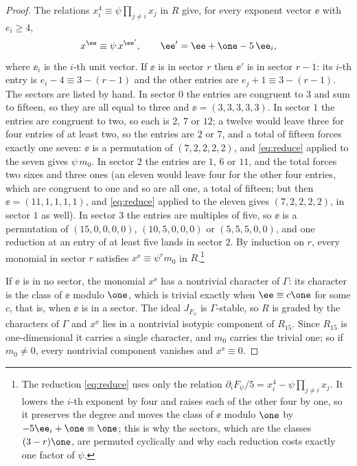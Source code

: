 \begin{proof}
The relations $x_i^4\equiv\psi\prod_{j\ne i}x_j$ in $R$ give, for every
exponent vector $\ee$ with $e_i\ge4$,
\begin{equation}\label{eq:reduce}
x^{\ee}\equiv\psi\,x^{\ee'},\qquad \ee'=\ee+\one-5\,\ee_i,
\end{equation}
where $\ee_i$ is the $i$-th unit vector. If $\ee$ is in sector $r$ then
$\ee'$ is in sector $r-1$: its $i$-th entry is $e_i-4\equiv 3-(r-1)$ and the
other entries are $e_j+1\equiv3-(r-1)$. The sectors are listed by hand. In
sector $0$ the entries are congruent to $3$ and sum to fifteen, so they are
all equal to three and $\ee=(3,3,3,3,3)$. In sector $1$ the entries are congruent to
two, so each is $2$, $7$ or $12$; a twelve would leave three for four
entries of at least two, so the entries are $2$ or $7$, and a total of
fifteen forces exactly one seven: $\ee$ is a
permutation of $(7,2,2,2,2)$, and \eqref{eq:reduce} applied to the seven
gives $\psi\,m_0$. In sector $2$ the entries are $1$, $6$ or $11$, and the
total forces two sixes and three ones (an eleven would leave four for the
other four entries, which are congruent to one and so are all one, a total
of fifteen; but then $\ee=(11,1,1,1,1)$, and \eqref{eq:reduce} applied to
the eleven gives $(7,2,2,2,2)$, in sector $1$ as well). In sector $3$ the
entries are multiples of five, so $\ee$ is a permutation of $(15,0,0,0,0)$,
$(10,5,0,0,0)$ or $(5,5,5,0,0)$, and one reduction at an entry of at least
five lands in sector $2$. By induction on $r$, every monomial in sector $r$
satisfies $x^{\ee}\equiv\psi^rm_0$ in $R$.\footnote{The reduction
\eqref{eq:reduce} uses only the relation $\partial_iF_\psi/5=x_i^4-\psi
\prod_{j\ne i}x_j$. It lowers the $i$-th exponent by four and raises each of
the other four by one, so it preserves the degree and moves the class of
$\ee$ modulo $\one$ by $-5\ee_i+\one\equiv\one$; this is why the sectors,
which are the classes $(3-r)\one$, are permuted cyclically and why each
reduction costs exactly one factor of $\psi$.}

If $\ee$ is in no sector, the monomial $x^{\ee}$ has a nontrivial character
of $\Gamma$: its character is the class of $\ee$ modulo $\one$, which is
trivial exactly when $\ee\equiv c\one$ for some $c$, that is, when $\ee$ is
in a sector. The ideal $J_{F_\psi}$ is $\Gamma$-stable, so $R$ is graded by
the characters of $\Gamma$ and $x^{\ee}$ lies in a nontrivial isotypic
component of $R_{15}$. Since $R_{15}$ is one-dimensional it carries a single
character, and $m_0$ carries the trivial one; so if $m_0\ne0$, every
nontrivial component vanishes and $x^{\ee}\equiv0$.


\end{proof}
